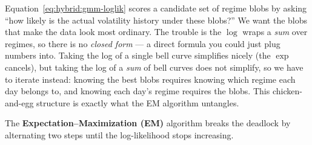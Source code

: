 \begin{intuition}
Equation~\eqref{eq:hybrid:gmm-loglik} scores a candidate set of regime
blobs by asking ``how likely is the actual volatility history under these
blobs?''  We want the blobs that make the data look most ordinary.  The
trouble is the $\log$ wraps a \emph{sum} over regimes, so there is no
\emph{closed form} --- a direct formula you could just plug numbers into.
Taking the log of a single bell curve simplifies nicely (the $\exp$
cancels), but taking the log of a \emph{sum} of bell curves does not
simplify, so we have to iterate instead: knowing the best blobs requires
knowing which regime each day belongs to, and knowing each day's regime
requires the blobs.  This chicken-and-egg structure is exactly what the EM
algorithm untangles.
\end{intuition}

The \textbf{Expectation--Maximization (EM)} algorithm
\citep{DempsterLairdRubin1977} breaks the deadlock by alternating two
steps until the log-likelihood stops increasing.

